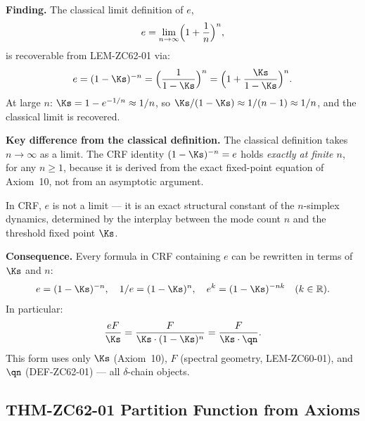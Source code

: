 \documentclass[12pt, a4paper]{article}
\begin{document}
\begin{derivedbox}[title={FIND-ZC62-01: $e$ Recovered as
  a CRF Structural Constant ($R_0$, Structural)}]

\textbf{Finding.}
The classical limit definition of $e$,
\[
  e = \lim_{n\to\infty}\Bigl(1 + \frac{1}{n}\Bigr)^n,
\]
is recoverable from LEM-ZC62-01 via:
\[
  e = (1-\Ks)^{-n}
    = \Bigl(\frac{1}{1-\Ks}\Bigr)^n
    = \Bigl(1 + \frac{\Ks}{1-\Ks}\Bigr)^n.
\]
At large $n$: $\Ks = 1-e^{-1/n} \approx 1/n$, so
$\Ks/(1-\Ks) \approx 1/(n-1) \approx 1/n$, and the
classical limit is recovered.

\textbf{Key difference from the classical definition.}
The classical definition takes $n\to\infty$ as a limit.
The CRF identity $(1-\Ks)^{-n} = e$ holds
\emph{exactly at finite $n$}, for any $n \geq 1$,
because it is derived from the exact fixed-point equation
of Axiom~10, not from an asymptotic argument.

In CRF, $e$ is not a limit --- it is an exact structural
constant of the $n$-simplex dynamics, determined by the
interplay between the mode count $n$ and the threshold
fixed point $\Ks$.

\textbf{Consequence.}
Every formula in CRF containing $e$ can be rewritten in
terms of $\Ks$ and $n$:
\[
  e = (1-\Ks)^{-n}, \quad
  1/e = (1-\Ks)^n, \quad
  e^k = (1-\Ks)^{-nk} \quad (k \in \mathbb{R}).
\]
In particular:
\[
  \frac{eF}{\Ks}
  = \frac{F}{\Ks \cdot (1-\Ks)^n}
  = \frac{F}{\Ks \cdot \qn}.
\]
This form uses only $\Ks$ (Axiom~10), $F$ (spectral geometry,
LEM-ZC60-01), and $\qn$ (DEF-ZC62-01) --- all $\delta$-chain
objects.
\end{derivedbox}

\subsection{THM-ZC62-01 \quad Partition Function from Axioms}
\label{sec:thm01}

\end{document}
